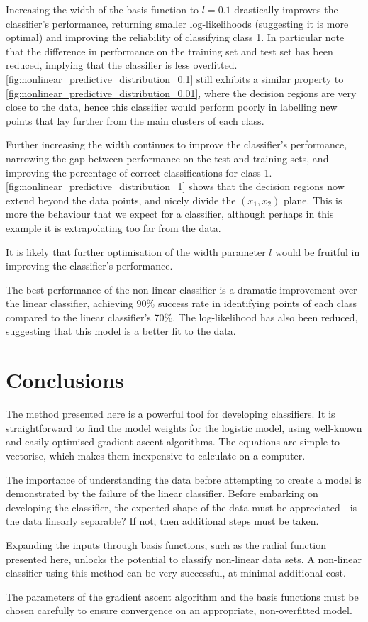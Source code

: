 \documentclass[a4paper]{article}
\begin{document}
    Increasing the width of the basis function to $l = 0.1$ drastically improves the classifier's performance,
    returning smaller log-likelihoods (suggesting it is more optimal) and improving the reliability of classifying class
    1. In particular note that the difference in performance on the training set and test set has been reduced, implying
    that the classifier is less overfitted. \autoref{fig:nonlinear_predictive_distribution_0.1} still exhibits a similar
    property to \autoref{fig:nonlinear_predictive_distribution_0.01}, where the decision regions are very close to the data,
    hence this classifier would perform poorly in labelling new points that lay further from the main clusters of each class.

    Further increasing the width continues to improve the classifier's performance, narrowing the gap between
    performance on the test and training sets, and improving the percentage of correct classifications for class 1.
    \autoref{fig:nonlinear_predictive_distribution_1} shows that the decision regions now extend beyond the data points,
    and nicely divide the $(x_1, x_2)$ plane. This is more the behaviour that we expect for a classifier,
    although perhaps in this example it is extrapolating too far from the data.

    It is likely that further optimisation of the width parameter $l$ would be fruitful in improving the
    classifier's performance.

    The best performance of the non-linear classifier is a dramatic improvement over the linear classifier, achieving 90\%
    success rate in identifying points of each class compared to the linear classifier's 70\%. The log-likelihood has also
    been reduced, suggesting that this model is a better fit to the data.

    \section{Conclusions}
    The method presented here is a powerful tool for developing classifiers. It is straightforward to find the
    model weights for the logistic model, using well-known and easily optimised gradient ascent algorithms. The equations
    are simple to vectorise, which makes them inexpensive to calculate on a computer.

    The importance of understanding the data before attempting to create a model is demonstrated by the failure
    of the linear classifier. Before embarking on developing the classifier, the expected shape of the data must be
    appreciated - is the data linearly separable? If not, then additional steps must be taken.

    Expanding the inputs through basis functions, such as the radial function presented here, unlocks the potential
    to classify non-linear data sets. A non-linear classifier using this method can be very successful, at minimal
    additional cost.

    The parameters of the gradient ascent algorithm and the basis functions must be chosen carefully
    to ensure convergence on an appropriate, non-overfitted model.
\end{document}
